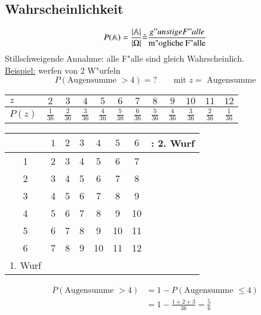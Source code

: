 \subsection{Wahrscheinlichkeit}
\begin{equation}
	P(\mathbb{A})=\frac{|\mathbb{A}|}{|\Omega|}\hat{=}\frac{g"unstige F"alle}{\text{m"ogliche F"alle}}
\end{equation}
Stillschweigende Annahme: alle F"alle sind gleich Wahrscheinlich. \\
\underline{Beispiel:} werfen von 2 W"urfeln
\begin{equation*}
	P(\text{Augensumme } > 4) = ?\qquad\text{mit } z =\text{ Augensumme}
\end{equation*}
\begin{center}
\begin{tabular}{l|ccccccccccc}
	$z$	& $2$ & $3$ & $4$ & $5$ & $6$ & $7$ & $8$ & $9$ & $10$ & $11$ & $12$ \\
	\hline
	$P(z)$ & $\frac{1}{36}$ & $\frac{2}{36}$ & $\frac{3}{36}$ & $\frac{4}{36}$ & $\frac{5}{36}$ & $\frac{6}{36}$ & $\frac{5}{36}$ & $\frac{4}{36}$ & $\frac{3}{36}$ & $\frac{2}{36}$ & $\frac{1}{36}$
\end{tabular}
\end{center}

\begin{center}
\begin{tabular}{c|cccccc|l}
	 & $1$ & $2$ & $3$ & $4$ & $5$ & $6$ & : 2. Wurf \\
	\hline
	1 & 2 & 3 & 4 & 5 & 6 & 7 \\
	2 & 3 & 4 & 5 & 6 & 7 & 8 \\
	3 & 4 & 5 & 6 & 7 & 8 & 9 \\
	4 & 5 & 6 & 7 & 8 & 9 & 10 \\
	5 & 6 & 7 & 8 & 9 & 10 & 11 \\
	6 & 7 & 8 & 9 & 10 & 11 & 12 \\
	\hline
	1. Wurf	
\end{tabular}
\end{center}
\begin{align*}
	P(\text{Augensumme } > 4) & = 1-P(\text{Augensumme } \leq 4) \\
		& = 1- \frac{1+2+3}{36} = \frac{5}{6}
\end{align*}

